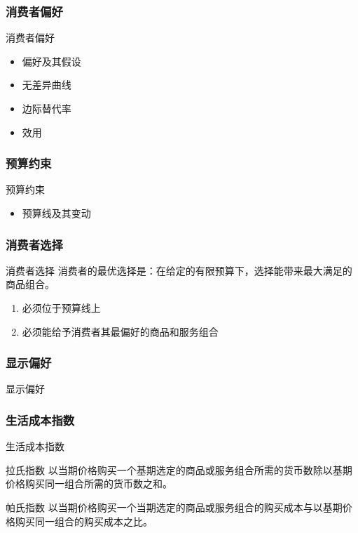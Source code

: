 \documentclass[UTF8]{ctexbeamer}
\begin{document}
\subsubsection{消费者偏好}
\begin{frame}{消费者偏好}
\begin{itemize}
\item 偏好及其假设
\item 无差异曲线
\item 边际替代率
\item 效用
\end{itemize}
\end{frame}

\subsubsection{预算约束}
\begin{frame}{预算约束}
\begin{itemize}
\item 预算线及其变动
\end{itemize}
\end{frame}

\subsubsection{消费者选择}
\begin{frame}{消费者选择}
\linespread{1.5}
消费者的最优选择是：在给定的有限预算下，选择能带来最大满足的商品组合。
\begin{enumerate}
\item 必须位于预算线上
\item 必须能给予消费者其最偏好的商品和服务组合
\end{enumerate}
\end{frame}

\subsubsection{显示偏好}
\begin{frame}{显示偏好}
\end{frame}

\subsubsection{生活成本指数}
\begin{frame}{生活成本指数}
\begin{block}{拉氏指数}
以当期价格购买一个{\heiti 基期选定}的商品或服务组合所需的货币数除以基期价格购买同一组合所需的货币数之和。
\end{block}

\begin{block}{帕氏指数}
以当期价格购买一个{\heiti 当期选定}的商品或服务组合的购买成本与以基期价格购买同一组合的购买成本之比。
\end{block}
\end{frame}
\end{document}
